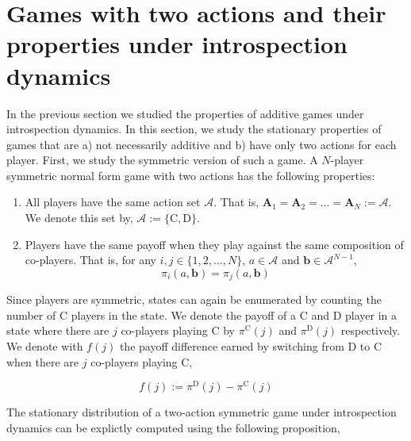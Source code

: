 \documentclass[11pt]{article}
\theoremstyle{plainCl1}
\theoremstyle{plainCl2}
\newcommand{\A}{\mathbf{A}}
\newcommand{\abf}{\mathbf{a}}
\newcommand{\bbf}{\mathbf{b}}
\newcommand{\C}{\mathrm{C}}
\newcommand{\D}{\mathrm{D}}
\begin{document}
\section*{Games with two actions and their properties under introspection dynamics}

In the previous section we studied the properties of additive games under introspection dynamics. In this section, we study the stationary properties of games that are a) not necessarily additive and b) have only two actions for each player. First, we study the symmetric version of such a game. A $N$-player symmetric normal form game with two actions has the following properties:

\begin{enumerate}
\item  All players have the same action set $\mathcal{A}$. That is, $\A_1 = \A_2 = ... = \A_N := \mathcal{A}$. We denote this set by, $\mathcal{A} := \{\C,\D\}$.
\item Players have the same payoff when they play against the same composition of co-players. That is, for any $i,j \in \{1,2,...,N\}$, $a \in \mathcal{A}$ and $\bbf \in \mathcal{A}^{N-1}$,
\begin{equation}
\pi_i(a,\bbf) = \pi_j(a,\bbf)
\end{equation} 
\end{enumerate}

\noindent Since players are symmetric, states can again be enumerated by counting the number of $\C$ players in the state. We denote the payoff of a $\C$ and $\D$ player in a state where there are $j$ co-players playing $\C$ by $\pi^\C(j)$ and $\pi^\D(j)$ respectively. We denote with $f(j)$ the payoff difference earned by switching from $\D$ to $\C$ when there are $j$ co-players playing $\C$, 

\begin{equation}
f(j) := \pi^\D(j) - \pi^\C(j)
\label{Eq:f-switching-CtoD}
\end{equation}

%
\noindent The stationary distribution of a two-action symmetric game under introspection dynamics can be explictly computed using the following proposition, 
\end{document}

